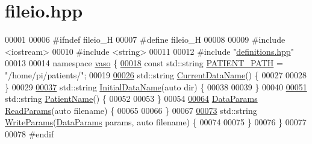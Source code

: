 \hypertarget{fileio_8hpp_source}{\section{fileio.\+hpp}
\label{fileio_8hpp_source}
}

\begin{DoxyCode}
00001 
00006 \textcolor{preprocessor}{#ifndef fileio\_H}
00007 \textcolor{preprocessor}{#define fileio\_H}
00008 
00009 \textcolor{preprocessor}{#include <iostream>}
00010 \textcolor{preprocessor}{#include <string>}
00011 
00012 \textcolor{preprocessor}{#include "\hyperlink{definitions_8hpp}{definitions.hpp}"}
00013 
00014 \textcolor{keyword}{namespace }\hyperlink{namespacevaso}{vaso} \{
\hypertarget{fileio_8hpp_source_l00018}{}\hyperlink{namespacevaso_a0f49c8240a13e7d853912ad78d5f53c9}{00018}     \textcolor{keyword}{const} std::string \hyperlink{namespacevaso_a0f49c8240a13e7d853912ad78d5f53c9}{PATIENT\_PATH} = \textcolor{stringliteral}{"/home/pi/patients/"};
00019 
\hypertarget{fileio_8hpp_source_l00026}{}\hyperlink{namespacevaso_abab641a332f2e834dfcdf294c0429426}{00026}     std::string \hyperlink{namespacevaso_abab641a332f2e834dfcdf294c0429426}{CurrentDataName}() \{
00027 
00028     \}
00029 
\hypertarget{fileio_8hpp_source_l00037}{}\hyperlink{namespacevaso_af8f45524d4770053c2b812ce33a7095f}{00037}     std::string \hyperlink{namespacevaso_af8f45524d4770053c2b812ce33a7095f}{InitialDataName}(\textcolor{keyword}{auto} dir) \{
00038 
00039     \}
00040 
\hypertarget{fileio_8hpp_source_l00051}{}\hyperlink{namespacevaso_a21e264fa912f7ca3f50e7e412ba1582e}{00051}     std::string \hyperlink{namespacevaso_a21e264fa912f7ca3f50e7e412ba1582e}{PatientName}() \{
00052 
00053     \}
00054 
\hypertarget{fileio_8hpp_source_l00064}{}\hyperlink{namespacevaso_a6f1a23c617aae2e2c4af5e8016b4d03e}{00064}     \hyperlink{structDataParams}{DataParams} \hyperlink{namespacevaso_a6f1a23c617aae2e2c4af5e8016b4d03e}{ReadParams}(\textcolor{keyword}{auto} filename) \{
00065 
00066     \}
00067 
\hypertarget{fileio_8hpp_source_l00073}{}\hyperlink{namespacevaso_ad8543c0caabf3836b4a93a78e0d487d1}{00073}     std::string \hyperlink{namespacevaso_ad8543c0caabf3836b4a93a78e0d487d1}{WriteParams}(\hyperlink{structDataParams}{DataParams} params, \textcolor{keyword}{auto} filename) \{
00074 
00075     \}
00076 \}
00077 
00078 \textcolor{preprocessor}{#endif}
\end{DoxyCode}
